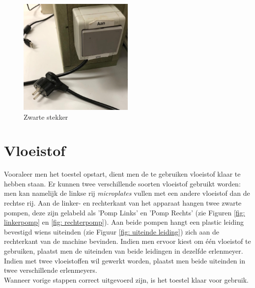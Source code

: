 \documentclass[a4paper,twoside,kulak]{kulakreport} %
\begin{document}
\begin{figure}[h]
	\centering
	\includegraphics[width=0.5\textwidth]{stekker.png}
	\caption{Zwarte stekker}
	\label{fig:stekker}
	
\end{figure} 





\section*{Vloeistof}

Vooraleer men het toestel opstart, dient men de te gebruiken vloeistof klaar te hebben staan. Er kunnen twee verschillende soorten vloeistof gebruikt worden: men kan namelijk de linkse rij \textit{microplates} vullen met een andere vloeistof dan de rechtse rij. Aan de linker- en rechterkant van het apparaat hangen twee zwarte pompen, deze zijn gelabeld als 'Pomp Links' en 'Pomp Rechts' (zie Figuren \ref{fig: linkerpomp} en \ref{fig: rechterpomp}). Aan beide pompen hangt een plastic leiding bevestigd wiens uiteinden (zie Figuur \ref{fig: uiteinde leiding}) zich aan de rechterkant van de machine bevinden. Indien men ervoor kiest om één vloeistof te gebruiken, plaatst men de uiteinden van beide leidingen in dezelfde erlenmeyer. Indien met twee vloeistoffen wil gewerkt worden, plaatst men beide uiteinden in twee verschillende erlenmeyers. \\ Wanneer vorige stappen correct uitgevoerd zijn, is het toestel klaar voor gebruik.
\end{document}
